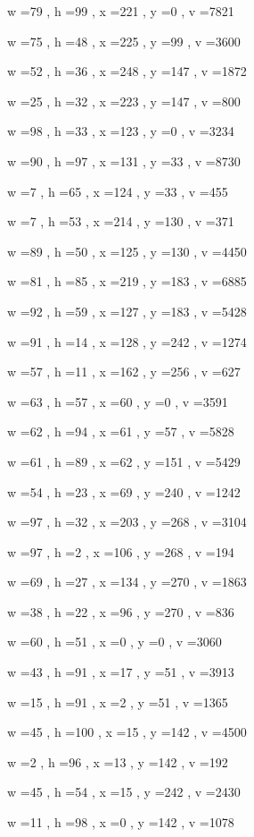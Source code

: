 \documentclass[11pt]{article}
\begin{document}
w =79 , h =99 , x =221 , y =0 , v =7821
\par
w =75 , h =48 , x =225 , y =99 , v =3600
\par
w =52 , h =36 , x =248 , y =147 , v =1872
\par
w =25 , h =32 , x =223 , y =147 , v =800
\par
w =98 , h =33 , x =123 , y =0 , v =3234
\par
w =90 , h =97 , x =131 , y =33 , v =8730
\par
w =7 , h =65 , x =124 , y =33 , v =455
\par
w =7 , h =53 , x =214 , y =130 , v =371
\par
w =89 , h =50 , x =125 , y =130 , v =4450
\par
w =81 , h =85 , x =219 , y =183 , v =6885
\par
w =92 , h =59 , x =127 , y =183 , v =5428
\par
w =91 , h =14 , x =128 , y =242 , v =1274
\par
w =57 , h =11 , x =162 , y =256 , v =627
\par
w =63 , h =57 , x =60 , y =0 , v =3591
\par
w =62 , h =94 , x =61 , y =57 , v =5828
\par
w =61 , h =89 , x =62 , y =151 , v =5429
\par
w =54 , h =23 , x =69 , y =240 , v =1242
\par
w =97 , h =32 , x =203 , y =268 , v =3104
\par
w =97 , h =2 , x =106 , y =268 , v =194
\par
w =69 , h =27 , x =134 , y =270 , v =1863
\par
w =38 , h =22 , x =96 , y =270 , v =836
\par
w =60 , h =51 , x =0 , y =0 , v =3060
\par
w =43 , h =91 , x =17 , y =51 , v =3913
\par
w =15 , h =91 , x =2 , y =51 , v =1365
\par
w =45 , h =100 , x =15 , y =142 , v =4500
\par
w =2 , h =96 , x =13 , y =142 , v =192
\par
w =45 , h =54 , x =15 , y =242 , v =2430
\par
w =11 , h =98 , x =0 , y =142 , v =1078
\par
\newpage
\end{document}

